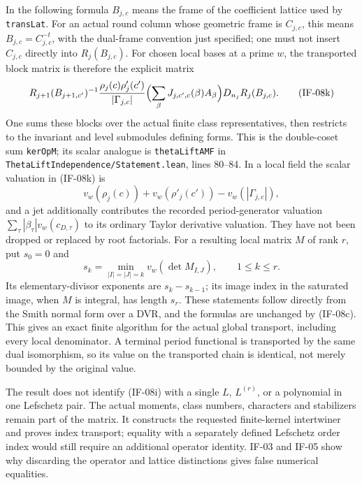 In the following formula $B_{j,c}$ means the frame of the coefficient
lattice used by \texttt{transLat}. For an actual round column whose
geometric frame is $C_{j,c}$, this means $B_{j,c}=C_{j,c}^{-t}$,
with the dual-frame convention just specified; one must not insert
$C_{j,c}$ directly into $R_j(B_{j,c})$. For chosen local bases at a
prime $w$, the transported block matrix is therefore the explicit matrix
\[
 R_{j+1}(B_{j+1,c'})^{-1}
 \frac{\rho_j(c)\rho'_j(c')}{|\Gamma_{j,c}|}
 \Bigl(\sum_{\beta}J_{j,c',c}(\beta)A_{\beta}\Bigr)
 D_{n_j} R_j(B_{j,c}).                              \tag{IF-08k}
\]
One sums these blocks over the actual finite class representatives,
then restricts to the invariant and level submodules defining forms.
This is the double-coset sum \texttt{kerOpM}; its scalar analogue is
\texttt{thetaLiftAMF} in \texttt{ThetaLiftIndependence/Statement.lean},
lines 80--84. In a local field the scalar valuation in (IF-08k) is
\[
 v_w(\rho_j(c))+v_w(\rho'_j(c'))-v_w(|\Gamma_{j,c}|),
\]
and a jet additionally contributes the recorded period-generator
valuation $\sum_\tau |\beta_\tau|v_w(c_{D,\tau})$ to its ordinary
Taylor derivative valuation. They have not been dropped or replaced
by root factorials. For a resulting local matrix $M$ of rank $r$,
put $s_0=0$ and
\[
 s_k=\min_{|I|=|J|=k}v_w(\det M_{I,J}),\qquad 1\leq k\leq r.
\]
Its elementary-divisor exponents are $s_k-s_{k-1}$; its image index
in the saturated image, when $M$ is integral, has length $s_r$.
These statements follow directly from the Smith normal form over a
DVR, and the formulas are unchanged by (IF-08c). This gives an exact
finite algorithm for the actual global transport, including every
local denominator. A terminal period functional is transported by
the same dual isomorphism, so its value on the transported chain is
identical, not merely bounded by the original value.

The result does not identify (IF-08i) with a single $L$, $L^{(r)}$,
or a polynomial in one Lefschetz pair. The actual moments,
class numbers, characters and stabilizers remain part of the matrix.
It constructs the requested finite-kernel intertwiner and proves
index transport; equality with a separately defined Lefschetz order
index would still require an additional operator identity. IF-03 and
IF-05 show why discarding the operator and lattice distinctions gives
false numerical equalities.

